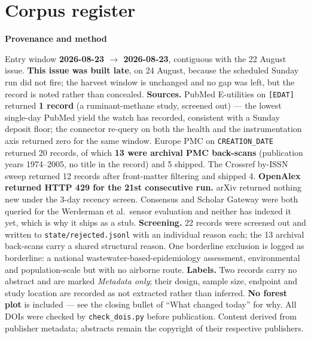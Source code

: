 \documentclass[10pt]{article}
\begin{document}
\vspace{4mm}
\section*{\sffamily\bfseries\color{Deep}Corpus register}
\vspace{-1.5mm}{\color{Amber}\rule{\linewidth}{1.1pt}}\vspace{2.5mm}



\vspace{4mm}
\begin{keybox}
{\sffamily\bfseries\footnotesize\color{Deep}Provenance and method}\\[1.2mm]
{\fontsize{7.2}{8.8}\selectfont
Entry window \textbf{2026-08-23 $\rightarrow$ 2026-08-23}, contiguous with the 22 August
issue. \textbf{This issue was built late}, on 24 August, because the scheduled Sunday run
did not fire; the harvest window is unchanged and no gap was left, but the record is noted
rather than concealed. \textbf{Sources.} PubMed E-utilities on \texttt{[EDAT]} returned
\textbf{1 record} (a ruminant-methane study, screened out) --- the lowest single-day
PubMed yield the watch has recorded, consistent with a Sunday deposit floor; the
connector re-query on both the health and the instrumentation axis returned zero for the
same window. Europe PMC on \texttt{CREATION\_DATE} returned 20 records, of which
\textbf{13 were archival PMC back-scans} (publication years 1974--2005, no title in the
record) and 5 shipped. The Crossref by-ISSN sweep returned 12 records after front-matter
filtering and shipped 4. \textbf{OpenAlex returned HTTP 429 for the 21st consecutive
run.} arXiv returned nothing new under the 3-day recency screen. Consensus and Scholar
Gateway were both queried for the Werderman et al.\ sensor evaluation and neither has
indexed it yet, which is why it ships as a stub.
\textbf{Screening.} 22 records were screened out and written to
\texttt{state/rejected.jsonl} with an individual reason each; the 13 archival back-scans
carry a shared structural reason. One borderline exclusion is logged as borderline:
a national wastewater-based-epidemiology assessment, environmental and
population-scale but with no airborne route.
\textbf{Labels.} Two records carry no abstract and are marked \textit{Metadata only};
their design, sample size, endpoint and study location are recorded as not extracted
rather than inferred. \textbf{No forest plot} is included --- see the closing bullet of
``What changed today'' for why. All DOIs were checked by \texttt{check\_dois.py} before
publication. Content derived from publisher metadata; abstracts remain the copyright of
their respective publishers.\par}
\end{keybox}
\end{document}
